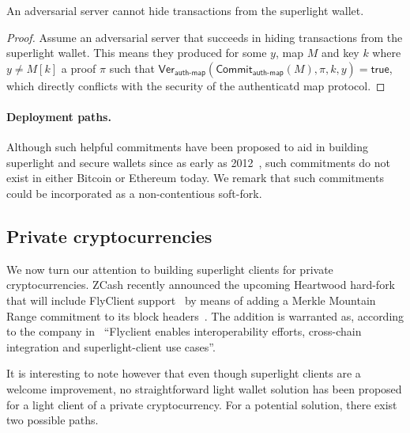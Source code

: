 \begin{theorem}[Uncensorability]
\label{superlight-uncensorability}
An adversarial server cannot hide transactions from the superlight wallet.
\end{theorem}
\begin{proof}
Assume an adversarial server that succeeds in hiding transactions from the superlight wallet. This means they produced for some $y$, map $M$ and key $k$ where $y \neq M[k]$ a proof $\pi$ such that $\textsf{Ver}_\textsf{auth-map}(\textsf{Commit}_\textsf{auth-map}(M), \pi, k, y) = \textsf{true}$, which directly conflicts with the security of the authenticatd map protocol.
\end{proof}

\paragraph{Deployment paths.}
Although such helpful commitments have been proposed to aid in building superlight and secure wallets since as early as 2012~\cite{ultimate}, such commitments do not exist in either Bitcoin or Ethereum today. We remark that such commitments could be incorporated as a non-contentious soft-fork.

\subsection{Private cryptocurrencies}
\label{superlight-private}
We now turn our attention to building superlight clients for private cryptocurrencies. ZCash recently announced the upcoming Heartwood hard-fork that will include FlyClient support~\cite{zcash-heartwood-news} by means of adding a Merkle Mountain Range commitment to its block headers~\cite{zcash-flyclient-zip}. The addition is warranted as, according to the company in~\cite{zcash-heartwood-news} ``Flyclient enables interoperability efforts, cross-chain integration and superlight-client use cases''.

It is interesting to note however that even though superlight clients are a welcome improvement, no straightforward light wallet solution has been proposed for a light client of a private cryptocurrency. For a potential solution, there exist two possible paths.

